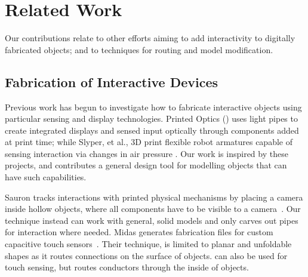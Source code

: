 \section{Related Work}
Our contributions relate to other efforts aiming to add interactivity to digitally fabricated objects; and to techniques for routing and model modification.  

\subsection{Fabrication of Interactive Devices}

Previous work has begun to investigate how to fabricate interactive objects using particular sensing and display technologies. Printed Optics (\cite{Willis-printedoptics}) uses light pipes to create integrated displays and sensed input optically through components added at print time; while Slyper, et al., 3D print flexible robot armatures capable of sensing interaction via changes in air pressure \cite{Slyper-pressure}. Our work is inspired by these projects, and contributes a general design tool for modelling objects that can have such capabilities.  

Sauron tracks interactions with printed physical mechanisms by placing a camera inside hollow objects, where all components have to be visible to a camera~\cite{Savage-sauron}.  Our technique instead can work with general, solid models and only carves out pipes for interaction where needed. Midas generates fabrication files for custom capacitive touch sensors~\cite{Savage-midas}.  Their technique, is limited to planar and unfoldable shapes as it routes connections on the surface of objects. \systemname can also be used for touch sensing, but routes conductors through the inside of objects.


